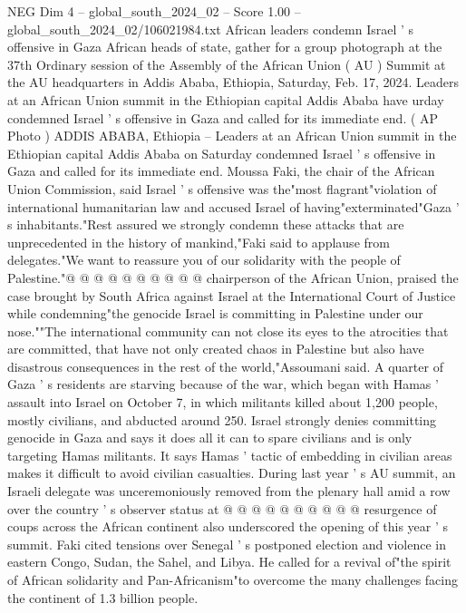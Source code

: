 \begin{textsample}{NEG Dim 4 – global\_south\_2024\_02 – Score 1.00 – global\_south\_2024\_02/106021984.txt}  \label{ex:f4_neg_390}
African leaders condemn Israel ' s offensive in Gaza African heads of state, gather for a group photograph at the 37th Ordinary session of the Assembly of the African Union ( AU ) Summit at the AU headquarters in Addis Ababa, Ethiopia, Saturday, Feb. 17, 2024.
Leaders at an African Union summit in the Ethiopian capital Addis Ababa have urday condemned Israel ' s offensive in Gaza and called for its immediate end. ( AP Photo ) ADDIS ABABA, Ethiopia -- Leaders at an African Union summit in the Ethiopian capital Addis Ababa on Saturday condemned Israel ' s offensive in Gaza and called for its immediate end.
Moussa Faki, the chair of the African Union Commission, said Israel ' s offensive was the"most flagrant"violation of international humanitarian law and accused Israel of having"exterminated"Gaza ' s inhabitants."Rest assured we strongly condemn these attacks that are unprecedented in the history of mankind,"Faki said to applause from delegates."We want to reassure you of our solidarity with the people of Palestine."@ @ @ @ @ @ @ @ @ @ chairperson of the African Union, praised the case brought by South Africa against Israel at the International Court of Justice while condemning"the genocide Israel is committing in Palestine under our nose.""The international community can not close its eyes to the atrocities that are committed, that have not only created chaos in Palestine but also have disastrous consequences in the rest of the world,"Assoumani said.
A quarter of Gaza ' s residents are starving because of the war, which began with Hamas ' assault into Israel on October 7, in which militants killed about 1,200 people, mostly civilians, and abducted around 250.
Israel strongly denies committing genocide in Gaza and says it does all it can to spare civilians and is only targeting Hamas militants.
It says Hamas ' tactic of embedding in civilian areas makes it difficult to avoid civilian casualties.
During last year ' s AU summit, an Israeli delegate was unceremoniously removed from the plenary hall amid a row over the country ' s observer status at @ @ @ @ @ @ @ @ @ @ resurgence of coups across the African continent also underscored the opening of this year ' s summit.
Faki cited tensions over Senegal ' s postponed election and violence in eastern Congo, Sudan, the Sahel, and Libya.
He called for a revival of"the spirit of African solidarity and Pan-Africanism"to overcome the many challenges facing the continent of 1.3 billion people.

\end{textsample}
